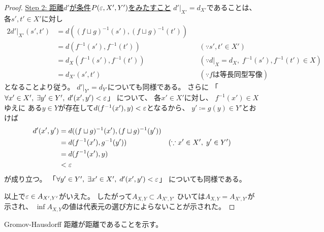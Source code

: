 \documentclass[report, notitlepage]{jlreq}
\newcommand{\CMet}{\mathrm{CMet}}
\newcommand{\GH}{\mathrm{GH}}
\begin{document}
\begin{proof}
    \uline{Step 2: 距離$d'$が条件$P(\varepsilon, X', Y')$をみたすこと} \quad
    $d'|_{X'} = d_{X'}$であることは、
    各$s', t' \in X'$に対し
    \begin{alignat}{2}
        d'|_{X'}(s', t')
            &=
                d((f \sqcup g)^{-1}(s'), (f \sqcup g)^{-1}(t'))
                &&
                \\
            &=
                d(f^{-1}(s'), f^{-1}(t'))
                \qquad
                &&(\because s', t' \in X')
                \\
            &=
                d_X(f^{-1}(s'), f^{-1}(t'))
                \qquad
                &&(\because d|_X = d_X, \; f^{-1}(s'), f^{-1}(t') \in X)
                \\
            &=
                d_{X'}(s', t')
                \qquad
                &&(\because \text{$f$は等長同型写像})
    \end{alignat}
    となることより従う。
    $d'|_{Y'} = d_{Y'}$についても同様である。
    さらに
    「$\forall x' \in X', \; \exists y' \in Y', \; d'(x', y') < \varepsilon$」
    について、
    各$x' \in X'$に対し、
    $f^{-1}(x') \in X$ゆえに
    ある$y \in Y$が存在して$d(f^{-1}(x'), y) < \varepsilon$となるから、
    $y' \coloneqq g(y) \in Y'$とおけば
    \begin{alignat}{2}
        d'(x', y')
            &=
                d((f \sqcup g)^{-1}(x'), (f \sqcup g)^{-1}(y'))
                &&
                \\
            &=
                d(f^{-1}(x'), g^{-1}(y'))
                \qquad
                &&(\because x' \in X', \; y' \in Y')
                \\
            &=
                d(f^{-1}(x'), y)
                \\
            &<
                \varepsilon
    \end{alignat}
    が成り立つ。
    「$\forall y' \in Y', \; \exists x' \in X', \; d'(x', y') < \varepsilon$」
    についても同様である。
    
    以上で$\varepsilon \in A_{X', Y'}$がいえた。
    したがって$A_{X, Y} \subset A_{X', Y'}$
    ひいては$A_{X, Y} = A_{X', Y'}$が示され、
    $\inf A_{X, Y}$の値は代表元の選び方によらないことが示された。
\end{proof}

Gromov-Hausdorff 距離が距離であることを示す。

\end{document}

